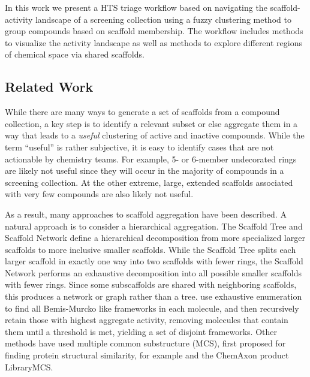 \documentclass[journal=jacsat,manuscript=article]{achemso}
\begin{document}
In this work we present a HTS triage workflow based on navigating the
scaffold-activity landscape of a screening collection using a fuzzy
clustering method to group compounds based on scaffold membership. The
workflow includes methods to visualize the activity landscape as well
as methods to explore different regions of chemical space via shared
scaffolds. 

\subsection{Related Work}
While there are many ways to generate a set of scaffolds from a
compound collection, a key step is to identify a relevant subset or else aggregate them in a way that leads to a {\it useful} clustering
of active and inactive compounds. While the term ``useful'' is rather
subjective, it is easy to identify cases that are not actionable by chemistry teams.
For example, 5- or 6-member undecorated rings are likely not useful since they will
occur in the majority of compounds in a screening collection. At the
other extreme, large, extended scaffolds associated with very
few compounds are also likely not useful.

As a result, many approaches to scaffold aggregation have been
described. A natural approach is to consider a hierarchical
aggregation. The Scaffold Tree\cite{Ertl2011ScaffoldTree} and Scaffold
Network\cite{Varin2011ScafNet} define a hierarchical decomposition
from more specialized larger scaffolds to more inclusive smaller
scaffolds. While the Scaffold Tree splits each larger scaffold in
exactly one way into two scaffolds with fewer rings, the Scaffold
Network performs an exhaustive decomposition into all possible smaller
scaffolds with fewer rings.  Since some subscaffolds are shared with
neighboring scaffolds, this produces a network or graph rather than a
tree.  \citet{Harper2004DDclus} use exhaustive enumeration to
find all Bemis-Murcko like frameworks in each molecule, and then
recursively retain those with highest aggregate activity,
removing molecules that contain them until a threshold is met,
yielding a set of disjoint frameworks.  Other methods have used
multiple common substructure (MCS), first proposed for finding protein
structural similarity\cite{Koch1997MCSprot}, for example
\citet{Quintus2009MCS} and the ChemAxon product LibraryMCS.

\end{document}
